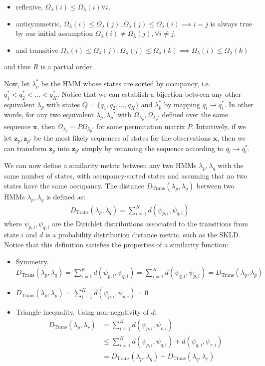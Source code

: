 \documentclass[pdftex,11pt,a4paper]{article}
\theoremstyle{definition}
\theoremstyle{remark}
\newcommand*{\V}[1]{\mathbf{#1}}%
\begin{document}
\begin{itemize}
\item reflexive, $\Omega_\lambda(i) \leq \Omega_\lambda(i) \forall i$,
\item antisymmetric, $\Omega_\lambda(i) \leq \Omega_\lambda(j), \Omega_\lambda(j) \leq \Omega_\lambda(i) \implies i = j$ is always true by our initial assumption $\Omega_\lambda(i) \neq \Omega_\lambda(j), \forall i\neq j$,
\item and transitive $\Omega_\lambda(i) \leq \Omega_\lambda(j), \Omega_\lambda(j) \leq \Omega_\lambda(k) \implies \Omega_\lambda(i) \leq \Omega_\lambda(k)$
\end{itemize}
and thus $R$ is a partial order.
\par Now, let $\lambda_p^\text{*}$ be the HMM whose states are sorted by occupancy, i.e. $q_1^\text{*} < q_2^\text{*} < ... < q_K^\text{*}$. Notice that we can establish a bijection between any other equivalent $\lambda_p$ with states $Q = \{q_1, q_2, ..., q_K\}$ and $\lambda_p^\text{*}$ by mapping $q_i \rightarrow q_i^\text{*}$. In other words, for any two equivalent $\lambda_p, \lambda_p'$ with $\Omega_{\lambda_p}, \Omega_{\lambda_p'}$ defined over the same sequence $\V{x}$, then $\Omega_{\lambda_p} = P\Omega_{\lambda_p'}$ for some permutation matrix $P$. Intuitively, if we let $\V{z}_p, \V{z}_{p'}$ be the most likely sequences of states for the observations $\V{x}$, then we can transform $\V{z}_p$ into $\V{z}_{p'}$ simply by renaming the sequence according to $q_i \rightarrow q_i^\text{*}$. 
\par We can now define a similarity metric between any two HMMs $\lambda_p, \lambda_q$ with the same number of states, with occupancy-sorted states and assuming that no two states have the same occupancy. The distance $D_{\text{Trans}}(\lambda_p, \lambda_q)$ between two HMMs $\lambda_p, \lambda_q$ is defined as:
\begin{align*}
D_{\text{Trans}}(\lambda_p, \lambda_q) = \sum_{i=1}^K d(\psi_{p, i}, \psi_{q, i})
\end{align*}
where $\psi_{p, i}, \psi_{q, i}$ are the Dirichlet distributions associated to the transitions from state $i$ and $d$ is a probability distribution distance metric, such as the SKLD. Notice that this definition satisfies the properties of a similarity function:
\begin{itemize}
\item Symmetry. $D_{\text{Trans}}(\lambda_p, \lambda_q) = \sum_{i=1}^K d(\psi_{p, i}, \psi_{q, i}) = \sum_{i=1}^K d(\psi_{q, i}, \psi_{p, i}) = D_{\text{Trans}}(\lambda_q, \lambda_p)$
\item $D_{\text{Trans}}(\lambda_p, \lambda_p) = \sum_{i=1}^K d(\psi_{p, i}, \psi_{p, i}) = 0$
\item Triangle inequality. Using non-negativity of $d$:
\begin{align*}
D_{\text{Trans}}(\lambda_p, \lambda_r) &= \sum_{i=1}^K d(\psi_{p, i}, \psi_{r, i}) \\
&\leq \sum_{i=1}^K d(\psi_{p, i}, \psi_{q, i}) + d(\psi_{q, i}, \psi_{r, i})\\
&= D_{\text{Trans}}(\lambda_p, \lambda_q) + D_{\text{Trans}}(\lambda_q, \lambda_r)
\end{align*}
\end{itemize}
\end{document}

